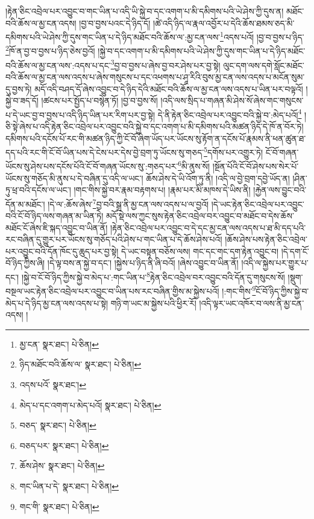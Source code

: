།རྟེན་ཅིང་འབྲེལ་པར་འབྱུང་བ་གང་ཡིན་པ་འདི་ཡི་སྐྱེ་བ་དང་འགག་པ་མི་དམིགས་པའི་ཡེ་ཤེས་ཀྱི་དུས་ན། མཐོང་བའི་ཆོས་ལ་མྱ་ངན་འདས། །བྱ་བ་བྱས་པའང་དེ་ཉིད་དོ། །ཚེ་འདི་ཉིད་ལ་རྣལ་འབྱོར་པ་དེའི་ཆོས་ཐམས་ཅད་མི་དམིགས་པའི་ཡེ་ཤེས་ཀྱི་དུས་གང་ཡིན་པ་དེ་ཉིད་མཐོང་བའི་ཆོས་ལ་:མྱ་ངན་ལས་\footnote{མྱ་ངན་  སྣར་ཐང་།  པེ་ཅིན། }འདས་པའོ། །བྱ་བ་བྱས་པ་ཉིད་\footnote{ཉིད་མཐོང་བའི་ཆོས་ལ་  སྣར་ཐང་།  པེ་ཅིན། }ཁོ་ན་བྱ་བ་བྱས་པ་ཉིད་ཅེས་བྱའོ། །སྐྱེ་བ་དང་འགག་པ་མི་དམིགས་པའི་ཡེ་ཤེས་ཀྱི་དུས་གང་ཡིན་པ་དེ་ཉིད་མཐོང་བའི་ཆོས་ལ་མྱ་ངན་ལས་:འདས་པ་དང་\footnote{འདས་པའོ་  སྣར་ཐང་། }བྱ་བ་བྱས་པ་ཞེས་བྱ་བར་ཤེས་པར་བྱ་སྟེ། ལུང་དག་ལས་དགེ་སློང་མཐོང་བའི་ཆོས་ལ་མྱ་ངན་ལས་འདས་པ་ཞེས་གསུངས་པ་དང་འཕགས་པ་ཤཱ་རིའི་བུས་མྱ་ངན་ལས་འདས་པ་མངོན་སུམ་དུ་བྱས་ཏེ། མདོ་འདི་བཤད་དོ་ཞེས་འབྱུང་བ་དེ་ཉིད་དེའི་མཐོང་བའི་ཆོས་ལ་མྱ་ངན་ལས་འདས་པ་ཡིན་པར་བལྟའོ། །སྐྱེ་བ་ཟད་དོ། །ཚངས་པར་སྤྱོད་པ་བསྙེན་ཏོ། །བྱ་བ་བྱས་སོ། །འདི་ལས་སྲིད་པ་གཞན་མི་ཤེས་སོ་ཞེས་གང་གསུངས་པ་དེ་ཡང་བྱ་བ་བྱས་པ་འདི་ཉིད་ཡིན་པར་རིག་པར་བྱ་སྟེ། དེ་ནི་རྟེན་ཅིང་འབྲེལ་པར་འབྱུང་བའི་སྐྱེ་བ་:མེད་པའོ།\footnote{མེད་པ་དང་འགག་པ་མེད་པའོ།  སྣར་ཐང་།  པེ་ཅིན། } །ཅི་སྟེ་ཞེས་པ་འདི་རྟེན་ཅིང་འབྲེལ་པར་འབྱུང་བའི་སྐྱེ་བ་དང་འགག་པ་མི་དམིགས་པའི་མཚན་ཉིད་དེ་ཁོ་ན་བོར་ཏེ། དམིགས་པའི་དངོས་པོ་རང་གི་མཚན་ཉིད་ཀྱི་ངོ་བོ་ཞིག་ཡོད་པར་ཡོངས་སུ་རྟོག་ན་དངོས་པོ་རྣམས་ནི་ཕན་ཚུན་ཐ་དད་པའི་རང་གི་ངོ་བོ་ཡིན་པས་དེ་ངེས་པར་དེས་བྱེ་བྲག་ཏུ་ཡོངས་སུ་གཅད་\footnote{བཅད་  སྣར་ཐང་།  པེ་ཅིན། }དགོས་པར་འགྱུར་ཏེ། ངོ་བོ་གཞན་ཡོངས་སུ་ཤེས་པས་དངོས་པོའི་ངོ་བོ་གཞན་ཡོངས་སུ་:གཅད་པར་\footnote{བཅད་པར་  སྣར་ཐང་།  པེ་ཅིན། }མི་ནུས་སོ། །སྔོན་པོའི་ངོ་བོ་ཤེས་པས་སེར་པོ་ཡོངས་སུ་གཅོད་མི་ནུས་པ་དེ་བཞིན་དུ་འདི་ལ་ཡང་། ཆོས་ཤེས་དེ་ཡི་འོག་ཏུ་ནི། །འདི་ལ་བྱེ་བྲག་དབྱེ་ཡོད་ན། །ཤིན་ཏུ་ཕྲ་བའི་དངོས་ལ་ཡང་། །གང་གིས་སྐྱེ་བར་རྣམ་བརྟགས་པ། །རྣམ་པར་མི་མཁས་དེ་ཡིས་ནི། །རྐྱེན་ལས་བྱུང་བའི་དོན་མ་མཐོང་། །དེ་ལ་:ཆོས་ཞེས་\footnote{ཆོས་ཤེས་  སྣར་ཐང་།  པེ་ཅིན། }བྱ་བའི་སྒྲ་ནི་མྱ་ངན་ལས་འདས་པ་ལ་བྱའོ། །དེ་ཡང་རྟེན་ཅིང་འབྲེལ་པར་འབྱུང་བའི་ངོ་བོ་ཉིད་ལས་གཞན་མ་ཡིན་ཏེ། མདོ་སྡེ་ལས་ཀྱང་སུས་རྟེན་ཅིང་འབྲེལ་བར་འབྱུང་བ་མཐོང་བ་དེས་ཆོས་མཐོང་ངོ་ཞེས་ཇི་སྐད་འབྱུང་བ་ཡིན་ནོ། །རྟེན་ཅིང་འབྲེལ་པར་འབྱུང་བ་དེ་དང་མྱ་ངན་ལས་འདས་པ་ཐ་མི་དད་པའི་རང་བཞིན་དུ་གྱུར་པར་ཡོངས་སུ་གཅོད་པའི་ཤེས་པ་གང་ཡིན་པ་དེ་ཆོས་ཤེས་པའོ། །ཆོས་ཤེས་པས་རྟེན་ཅིང་འབྲེལ་པར་འབྱུང་བའི་དོན་ཁོང་དུ་ཆུད་པར་བྱ་སྟེ། དེ་ཡང་བསྟན་བཅོས་ལས། གང་དང་གང་དག་རྟེན་འབྱུང་བ། །དེ་དག་ངོ་བོ་ཉིད་ཀྱིས་ཞི། །དེ་ལྟ་བས་ན་སྐྱེ་བ་དང་། །སྐྱེས་པ་ཉིད་ནི་ཞི་བའོ། །ཞེས་འབྱུང་བ་ཡིན་ནོ། །འདི་ལ་སྐྱེས་པར་གྱུར་པ་དང་། །སྐྱེ་བ་ངོ་བོ་ཉིད་ཀྱིས་སྐྱེ་བ་མེད་པ་:གང་ཡིན་པ་\footnote{གང་ཡིན་པ་དེ་  སྣར་ཐང་།  པེ་ཅིན། }རྟེན་ཅིང་འབྲེལ་བར་འབྱུང་བའི་དོན་དུ་གསུངས་སོ། །སྡུག་བསྔལ་ཡང་རྟེན་ཅིང་འབྲེལ་པར་འབྱུང་བ་ཡིན་པས་རང་བཞིན་གྱིས་མ་སྐྱེས་པའོ། །:གང་གིས་\footnote{གང་གི་  སྣར་ཐང་།  པེ་ཅིན། }ངོ་བོ་ཉིད་ཀྱིས་སྐྱེ་བ་མེད་པ་དེ་ཉིད་མྱ་ངན་ལས་འདས་པ་སྟེ། གཉི་ག་ཡང་མ་སྐྱེས་པའི་ཕྱིར་རོ། །འདི་ལྟར་ཡང་འཁོར་བ་ལས་ནི་མྱ་ངན་འདས། །
